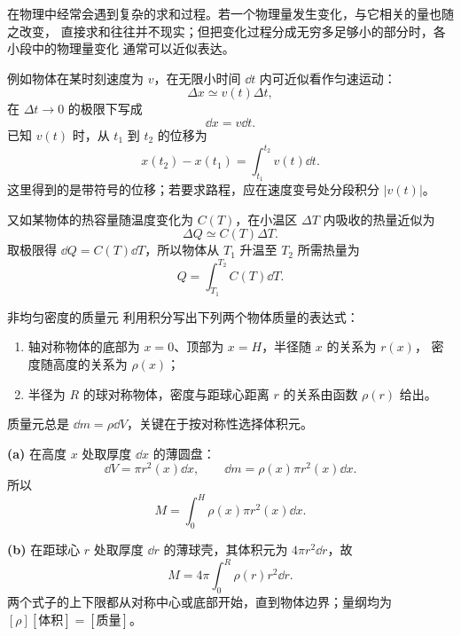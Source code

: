 {在物理中经常会遇到复杂的求和过程。若一个物理量发生变化，与它相关的量也随之改变，
直接求和往往并不现实；但把变化过程分成无穷多足够小的部分时，各小段中的物理量变化
通常可以近似表达。

例如物体在某时刻速度为 $v$，在无限小时间 $\dd t$ 内可近似看作匀速运动：
\begin{equation}
 \Delta x\simeq v(t)\Delta t,
\end{equation}
在 $\Delta t\to0$ 的极限下写成
\begin{equation}
 \dd x=v\dd t.
\end{equation}
已知 $v(t)$ 时，从 $t_1$ 到 $t_2$ 的位移为
\begin{equation}
 x(t_2)-x(t_1)=\int_{t_1}^{t_2}v(t)\dd t.
\end{equation}
这里得到的是带符号的位移；若要求路程，应在速度变号处分段积分 $|v(t)|$。

又如某物体的热容量随温度变化为 $C(T)$，在小温区 $\Delta T$ 内吸收的热量近似为
\begin{equation}
 \Delta Q\simeq C(T)\Delta T.
\end{equation}
取极限得 $\dd Q=C(T)\dd T$，所以物体从 $T_1$ 升温至 $T_2$ 所需热量为
\begin{equation}
 Q=\int_{T_1}^{T_2}C(T)\dd T.
\end{equation}

\begin{origexamplebox}{非均匀密度的质量元}\label{ch01:ex:s15-1-21}
利用积分写出下列两个物体质量的表达式：
\begin{enumerate}[label=(\alph*),leftmargin=2.2em]
 \item 轴对称物体的底部为 $x=0$、顶部为 $x=H$，半径随 $x$ 的关系为 $r(x)$，
 密度随高度的关系为 $\rho(x)$；
 \item 半径为 $R$ 的球对称物体，密度与距球心距离 $r$ 的关系由函数 $\rho(r)$ 给出。
\end{enumerate}

\end{origexamplebox}

\begin{xesolution}
质量元总是 $\dd m=\rho\dd V$，关键在于按对称性选择体积元。

\textbf{(a)} 在高度 $x$ 处取厚度 $\dd x$ 的薄圆盘：
\[
 \dd V=\pi r^2(x)\dd x,
 \qquad
 \dd m=\rho(x)\pi r^2(x)\dd x.
\]
所以
\[
 \boxed{M=\int_0^H\rho(x)\pi r^2(x)\dd x}.
\]

\textbf{(b)} 在距球心 $r$ 处取厚度 $\dd r$ 的薄球壳，其体积元为
$4\pi r^2\dd r$，故
\[
 \boxed{M=4\pi\int_0^R\rho(r)r^2\dd r}.
\]
两个式子的上下限都从对称中心或底部开始，直到物体边界；量纲均为
$[\rho][\text{体积}]=[\text{质量}]$。


\end{xesolution}}
